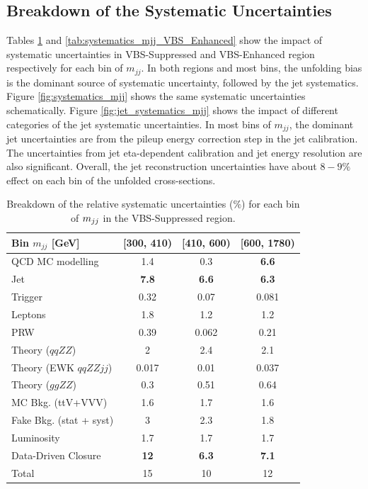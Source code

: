 \subsection{Breakdown of the Systematic Uncertainties }
\label{subsec:SysUncBreakdown}
Tables \ref{tab:systematics_mjj_VBS_Suppressed} and \ref{tab:systematics_mjj_VBS_Enhanced} show the impact of systematic uncertainties in VBS-Suppressed and VBS-Enhanced region respectively for each bin of $m_{jj}$. In both regions and most bins, the unfolding bias is the dominant source of systematic uncertainty, followed by the jet systematics. Figure \ref{fig:systematics_mjj} shows the same systematic uncertainties schematically. Figure \ref{fig:jet_systematics_mjj} shows the impact of different categories of the jet systematic uncertainties. In most bins of $m_{jj}$, the dominant jet uncertainties are from the pileup energy correction step in the jet calibration. The uncertainties from jet eta-dependent calibration and jet energy resolution are also significant. Overall, the jet reconstruction uncertainties have about $8-9\%$ effect on each bin of the unfolded cross-sections.

\begin{table}
\centering
\begin{tabular}{|l || c | c | c | }
\hline 
Bin $m_{jj}$ [GeV] & [300, 410) & [410, 600) & [600, 1780)\\
\hline 
QCD MC modelling & 1.4 & 0.3 & \textbf{6.6 }\\
Jet & \textbf{7.8} & \textbf{6.6} & \textbf{6.3 }\\
Trigger & 0.32 & 0.07 & 0.081 \\
Leptons & 1.8 & 1.2 & 1.2 \\
PRW & 0.39 & 0.062 & 0.21\\
Theory ($qqZZ$) & 2 & 2.4 & 2.1 \\
Theory (EWK $qqZZjj$) & 0.017 & 0.01 & 0.037 \\
Theory ($ggZZ$) & 0.3 & 0.51 & 0.64 \\
MC Bkg. (ttV+VVV) & 1.6 & 1.7 & 1.6 \\
Fake Bkg. (stat + syst) & 3 & 2.3 & 1.8 \\
Luminosity & 1.7 & 1.7 & 1.7 \\
Data-Driven Closure & \textbf{12} & \textbf{6.3} & \textbf{7.1}\\
\hline
Total & 15 & 10 & 12 \\
\hline
\end{tabular}
\caption{Breakdown of the relative systematic uncertainties ($\%$) for each bin of $m_{jj}$ in the VBS-Suppressed region. \label{tab:systematics_mjj_VBS_Suppressed}}
\end{table}


